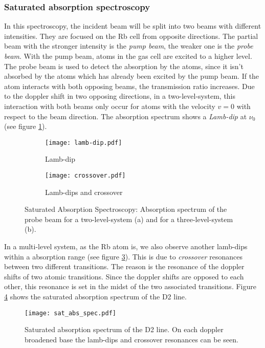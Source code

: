 \subsubsection{Saturated absorption spectroscopy}
\enlargethispage{4em}
In this spectroscopy, the incident beam will be split into two beams with different intensities. They are focused on the Rb cell from opposite directions. The partial beam with the stronger intensity is the \emph{pump beam}, the weaker one is the \emph{probe beam}. With the pump beam, atoms in the gas cell are excited to a higher level. The probe beam is used to detect the absorption by the atoms, since it isn't absorbed by the atoms which has already been excited by the pump beam. If the atom interacts with both opposing beams, the transmission ratio increases. Due to the doppler shift in two opposing directions, in a two-level-system, this interaction with both beams only occur for atoms with the velocity $v=0$ with respect to the beam direction. The absorption spectrum shows a \emph{Lamb-dip} at $\nu_0$ (see figure \ref{fig:lamb-dip}).

\begin{figure}[h]
	\centering
	\vspace{-3ex}
	\begin{subfigure}{0.45\textwidth}
		\centering
		\texttt{[image: lamb-dip.pdf]}
		\vspace{-2em}
		\caption{Lamb-dip}
		\label{fig:lamb-dip}
	\end{subfigure}
	\hfill
	\begin{subfigure}{0.45\textwidth}
		\centering
		\texttt{[image: crossover.pdf]}
		\vspace{-2em}
		\caption{Lamb-dips and crossover}
		\label{fig:crossover}
	\end{subfigure}
	\caption[Saturated Absorption Spectroscopy]{Saturated Absorption Spectroscopy: Absorption spectrum of the probe beam for a two-level-system (a) and for a three-level-system (b).}
	\vspace{-1ex}
\end{figure}
In a multi-level system, as the Rb atom is, we also observe another lamb-dips within a absorption range (see figure \ref{fig:crossover}). This is due to \emph{crossover} resonances between two different transitions. The reason is the resonance of the doppler shifts of two atomic transitions. Since the doppler shifts are opposed to each other, this resonance is set in the midst of the two associated transitions.
Figure \ref{fig:sat_abs_spec} shows the saturated absorption spectrum of the D2 line.
\begin{figure}[h]
	\centering
	\vspace{-1em}
	\texttt{[image: sat\_abs\_spec.pdf]}
	\caption[Saturated absorption spectrum of the D2 line]{Saturated absorption spectrum of the D2 line. On each doppler broadened base the lamb-dips and crossover resonances can be seen. \cite{lit:AK_manual2012}}
	\label{fig:sat_abs_spec}
	\vspace{-3em}
\end{figure}

